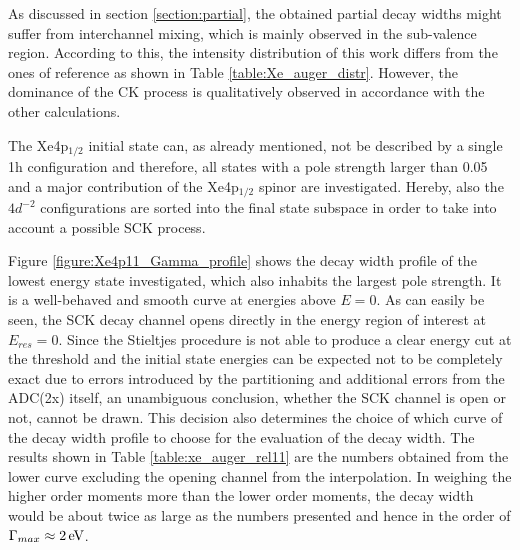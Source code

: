 As discussed in section \ref{section:partial}, the obtained partial decay
widths might suffer from interchannel mixing, which is mainly observed in
the sub-valence region. According to this, the intensity distribution
of this work  differs from the ones of reference \cite{Heinaesmaeki04} as
shown in Table \ref{table:Xe_auger_distr}. However, the dominance of the
\ac{CK} process is qualitatively observed in accordance with the other
calculations.


The Xe4p$_{1/2}$ initial state can, as already mentioned, not be described
by a single 1h configuration and therefore, all states with a pole strength
larger than 0.05 and a major contribution of the Xe4p$_{1/2}$ spinor are
investigated. Hereby, also the $4d^{-2}$ configurations are sorted into the
final state subspace in order to take into account a possible \ac{SCK} process.

Figure \ref{figure:Xe4p11_Gamma_profile} shows the decay width profile
of the lowest energy state investigated, which also inhabits the largest
pole strength. It is a well-behaved and smooth curve at energies above $E=0$.
As can easily be seen, the \ac{SCK} decay channel opens directly
in the energy region of interest at $E_{res}=0$. Since the Stieltjes procedure
is not able to produce a clear energy cut at the threshold and the initial state
energies can be expected not to be completely exact due to errors introduced
by the partitioning and additional errors from the ADC(2x) itself, an
unambiguous conclusion, whether the \ac{SCK} channel is open or not,
cannot be drawn.
This decision also determines the choice of which curve of the decay width
profile to choose for the evaluation of the decay width. The results shown
in Table \ref{table:xe_auger_rel11} are the numbers obtained from the
lower curve excluding
the opening channel from the interpolation. In weighing the higher order moments
more than the lower order moments, the decay width would be about twice
as large as the numbers
presented and hence in the order of $\Gamma_{max} \approx \unit[2]{eV}$.

